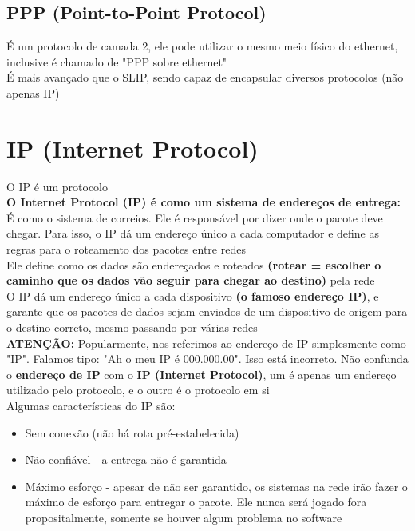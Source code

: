 \documentclass{article}
\begin{document}
\subsection{PPP (Point-to-Point Protocol)}
É um protocolo de camada 2, ele pode utilizar o mesmo meio físico do ethernet, inclusive é chamado de "PPP sobre ethernet"
\\[10pt]
É mais avançado que o SLIP, sendo capaz de encapsular diversos protocolos (não apenas IP)

\section{IP (Internet Protocol)}
O IP é um protocolo
\\[10pt]
\textbf{O Internet Protocol (IP) é como um sistema de endereços de entrega:} É como o sistema de correios. Ele é responsável por dizer onde o pacote deve chegar. Para isso, o IP dá um endereço único a cada computador e define as regras para o roteamento dos pacotes entre redes
\\[10pt]
Ele define como os dados são endereçados e roteados \textbf{(rotear = escolher o caminho que os dados vão seguir para chegar ao destino)} pela rede
\\[10pt]
O IP dá um endereço único a cada dispositivo \textbf{(o famoso endereço IP)}, e garante que os pacotes de dados sejam enviados de um dispositivo de origem para o destino correto, mesmo passando por várias redes
\\[10pt]
\textbf{ATENÇÃO:} Popularmente, nos referimos ao endereço de IP simplesmente como "IP". Falamos tipo: "Ah o meu IP é 000.000.00". Isso está incorreto. Não confunda o \textbf{endereço de IP} com o \textbf{IP (Internet Protocol)}, um é apenas um endereço utilizado pelo protocolo, e o outro é o protocolo em si
\\[10pt]
Algumas características do IP são:

\begin{itemize}
    \item Sem conexão (não há rota pré-estabelecida)

    \item Não confiável - a entrega não é garantida

    \item Máximo esforço - apesar de não ser garantido, os sistemas na rede irão fazer o máximo de esforço para entregar o pacote. Ele nunca será jogado fora propositalmente, somente se houver algum problema no software
\end{itemize}
\end{document}
